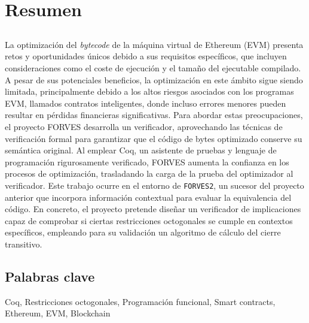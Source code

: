 \chapter*{Resumen}

\section*{\tituloPortadaVal}


La optimización del \emph{bytecode} de la máquina virtual de Ethereum (EVM) presenta retos y
oportunidades únicos debido a sus requisitos específicos, que incluyen consideraciones como 
el coste de ejecución y el tamaño del ejecutable compilado. A pesar de sus potenciales 
beneficios, la optimización en este ámbito sigue siendo limitada, principalmente debido a los 
altos riesgos asociados con los programas EVM, llamados contratos inteligentes, donde incluso
errores menores pueden resultar en pérdidas financieras significativas. Para abordar estas 
preocupaciones, el proyecto FORVES desarrolla un verificador, aprovechando las técnicas de 
verificación formal para garantizar que el código de bytes optimizado conserve su semántica
original. Al emplear Coq, un asistente de pruebas y lenguaje de programación rigurosamente 
verificado, FORVES aumenta la confianza en los procesos de optimización, trasladando la carga 
de la prueba del optimizador al verificador. Este trabajo ocurre en el entorno de \verb|FORVES2|,
un sucesor del proyecto anterior que incorpora información contextual para evaluar la equivalencia
del código. En concreto, el proyecto pretende diseñar un verificador de implicaciones capaz de 
comprobar si ciertas restricciones octogonales se cumple en contextos específicos, empleando para
su validación un algoritmo de cálculo del cierre transitivo.

\section*{Palabras clave}

\noindent Coq, Restricciones octogonales, Programación funcional, Smart contracts, Ethereum, EVM, Blockchain